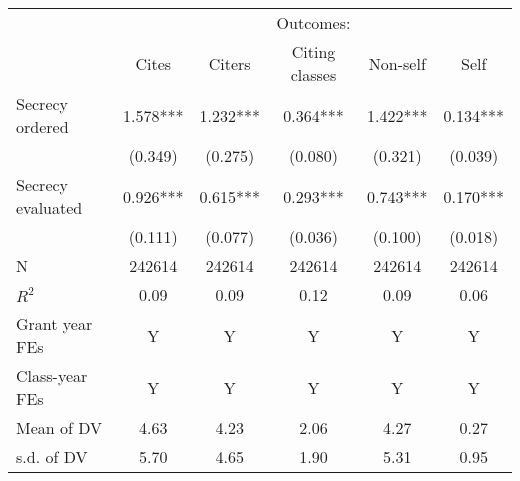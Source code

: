 {
\def\sym#1{\ifmmode^{#1}\else\(^{#1}\)\fi}
\begin{tabular}{l*{5}{c}}
\hline\hline
                        &\multicolumn{5}{c}{Outcomes:}                                                  \\
                        &\multicolumn{1}{c}{Cites}&\multicolumn{1}{c}{Citers}&\multicolumn{1}{c}{Citing classes}&\multicolumn{1}{c}{Non-self}&\multicolumn{1}{c}{Self}\\
\hline
Secrecy ordered         &       1.578***&       1.232***&       0.364***&       1.422***&       0.134***\\
                        &     (0.349)   &     (0.275)   &     (0.080)   &     (0.321)   &     (0.039)   \\
Secrecy evaluated       &       0.926***&       0.615***&       0.293***&       0.743***&       0.170***\\
                        &     (0.111)   &     (0.077)   &     (0.036)   &     (0.100)   &     (0.018)   \\
\hline
N                       &      242614   &      242614   &      242614   &      242614   &      242614   \\
$R^2$                   &        0.09   &        0.09   &        0.12   &        0.09   &        0.06   \\
Grant year FEs          &           Y   &           Y   &           Y   &           Y   &           Y   \\
Class-year FEs          &           Y   &           Y   &           Y   &           Y   &           Y   \\
Mean of DV              &        4.63   &        4.23   &        2.06   &        4.27   &        0.27   \\
s.d. of DV              &        5.70   &        4.65   &        1.90   &        5.31   &        0.95   \\
\hline\hline
\end{tabular}
}
